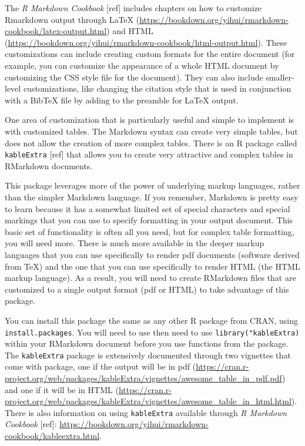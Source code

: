 \documentclass[]{tufte-book}
\begin{document}
The \emph{R Markdown Cookbook} {[}ref{]} includes chapters on how to customize Rmarkdown
output through LaTeX
(\url{https://bookdown.org/yihui/rmarkdown-cookbook/latex-output.html}) and HTML
(\url{https://bookdown.org/yihui/rmarkdown-cookbook/html-output.html}). These
customizations can include creating custom formats for the entire document (for
example, you can customize the appearance of a whole HTML document by
customizing the CSS style file for the document). They can also include
smaller-level customizations, like changing the citation style that is used in
conjunction with a BibTeX file by adding to the preamble for LaTeX output.

One area of customization that is particularly useful and simple to implement is
with customized tables. The Markdown syntax can create very simple tables, but
does not allow the creation of more complex tables. There is an R package called
\texttt{kableExtra} {[}ref{]} that allows you to create very attractive and complex tables
in RMarkdown documents.

This package leverages more of the power of underlying markup languages, rather
than the simpler Markdown language. If you remember, Markdown is pretty easy to
learn because it has a somewhat limited set of special characters and special
markings that you can use to specify formatting in your output document. This
basic set of functionality is often all you need, but for complex table
formatting, you will need more. There is much more available in the deeper
markup languages that you can use specifically to render pdf documents (software
derived from TeX) and the one that you can use specifically to render HTML (the
HTML markup language). As a result, you will need to create RMarkdown files that
are customized to a single output format (pdf or HTML) to take advantage of this
package.

You can install this package the same as any other R package from CRAN, using
\texttt{install.packages}. You will need to use then need to use \texttt{library("kableExtra)}
within your RMarkdown document before you use functions from the package. The
\texttt{kableExtra} package is extensively documented through two vignettes that come
with package, one if the output will be in pdf
(\url{https://cran.r-project.org/web/packages/kableExtra/vignettes/awesome_table_in_pdf.pdf})
and one if it will be in HTML
(\url{https://cran.r-project.org/web/packages/kableExtra/vignettes/awesome_table_in_html.html}).
There is also information on using \texttt{kableExtra} available through \emph{R Markdown
Cookbook} {[}ref{]}: \url{https://bookdown.org/yihui/rmarkdown-cookbook/kableextra.html}.
\end{document}
